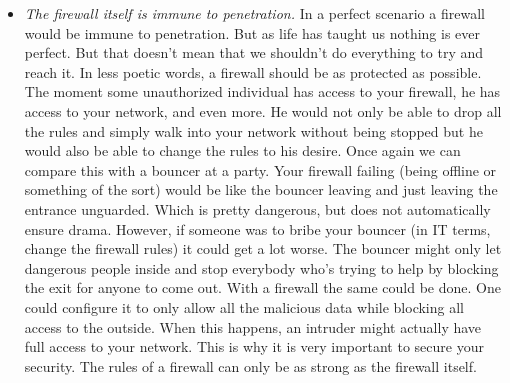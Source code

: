 \begin{itemize}
\item \textit{The firewall itself is immune to penetration.} In a perfect scenario a firewall would be immune to penetration. But as life has taught us nothing is ever perfect. But that doesn't mean that we shouldn't do everything to try and reach it. In less poetic words, a firewall should be as protected as possible. The moment some unauthorized individual has access to your firewall, he has access to your network, and even more. He would not only be able to drop all the rules and simply walk into your network without being stopped but he would also be able to change the rules to his desire. Once again we can compare this with a bouncer at a party. Your firewall failing (being offline or something of the sort) would be like the bouncer leaving and just leaving the entrance unguarded. Which is pretty dangerous, but does not automatically ensure drama. However, if someone was to bribe your bouncer (in IT terms, change the firewall rules) it could get a lot worse. The bouncer might only let dangerous people inside and stop everybody who's trying to help by blocking the exit for anyone to come out. With a firewall the same could be done. One could configure it to only allow all the malicious data while blocking all access to the outside. When this happens, an intruder might actually have full access to your network. This is why it is very important to secure your security. The rules of a firewall can only be as strong as the firewall itself.
\end{itemize}
